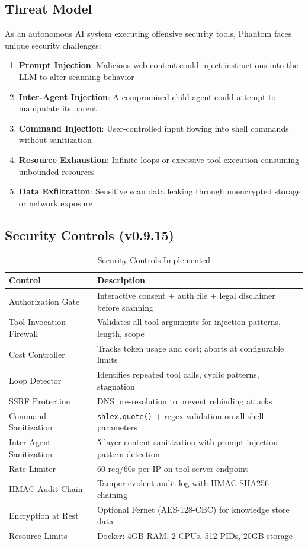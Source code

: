\documentclass[12pt,a4paper]{article}
\begin{document}
\subsection{Threat Model}

As an autonomous AI system executing offensive security tools, Phantom
faces unique security challenges:

\begin{enumerate}[nosep]
    \item \textbf{Prompt Injection}: Malicious web content could inject
          instructions into the LLM to alter scanning behavior
    \item \textbf{Inter-Agent Injection}: A compromised child agent could
          attempt to manipulate its parent
    \item \textbf{Command Injection}: User-controlled input flowing into
          shell commands without sanitization
    \item \textbf{Resource Exhaustion}: Infinite loops or excessive tool
          execution consuming unbounded resources
    \item \textbf{Data Exfiltration}: Sensitive scan data leaking through
          unencrypted storage or network exposure
\end{enumerate}

\subsection{Security Controls (v0.9.15)}

\begin{table}[H]
\centering
\caption{Security Controls Implemented}
\begin{tabularx}{\textwidth}{lX}
\toprule
\textbf{Control} & \textbf{Description} \\
\midrule
Authorization Gate & Interactive consent + auth file + legal disclaimer before scanning \\
Tool Invocation Firewall & Validates all tool arguments for injection patterns, length, scope \\
Cost Controller & Tracks token usage and cost; aborts at configurable limits \\
Loop Detector & Identifies repeated tool calls, cyclic patterns, stagnation \\
SSRF Protection & DNS pre-resolution to prevent rebinding attacks \\
Command Sanitization & \texttt{shlex.quote()} + regex validation on all shell parameters \\
Inter-Agent Sanitization & 5-layer content sanitization with prompt injection pattern detection \\
Rate Limiter & 60 req/60s per IP on tool server endpoint \\
HMAC Audit Chain & Tamper-evident audit log with HMAC-SHA256 chaining \\
Encryption at Rest & Optional Fernet (AES-128-CBC) for knowledge store data \\
Resource Limits & Docker: 4GB RAM, 2 CPUs, 512 PIDs, 20GB storage \\
\bottomrule
\end{tabularx}
\end{table}
\end{document}
